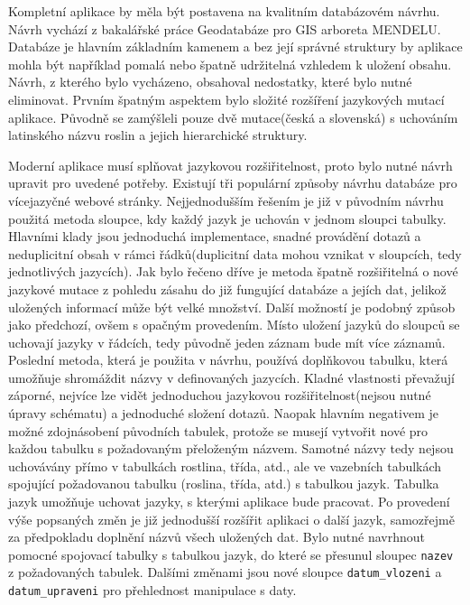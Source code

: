\documentclass[12pt]{article}%
\begin{document}
{{\obrazek
{}

Kompletní aplikace by měla být postavena na kvalitním databázovém návrhu. Návrh vychází 
z bakalářské práce Geodatabáze pro GIS arboreta MENDELU. Databáze je hlavním základním 
kamenem a bez její správné struktury by aplikace mohla být například pomalá nebo špatně udržitelná 
vzhledem k uložení obsahu. Návrh, z kterého bylo vycházeno, obsahoval nedostatky, které bylo 
nutné eliminovat. Prvním špatným aspektem bylo složité rozšíření jazykových mutací aplikace. 
Původně se zamýšleli pouze dvě mutace(česká a slovenská) s uchováním latinského názvu roslin 
a jejich hierarchické struktury. 

Moderní aplikace musí splňovat jazykovou rozšiřitelnost, proto 
bylo nutné návrh upravit pro uvedené potřeby. Existují tři populární způsoby návrhu databáze 
pro vícejazyčné webové stránky. Nejjednodušším řešením je již v původním návrhu použitá metoda sloupce, 
kdy každý jazyk je uchován v jednom sloupci tabulky. Hlavními klady jsou jednoduchá implementace, 
snadné provádění dotazů a neduplicitní obsah v rámci řádků(duplicitní data mohou vznikat 
v sloupcích, tedy jednotlivých jazycích). Jak bylo řečeno dříve je metoda špatně rozšiřitelná 
o nové jazykové mutace z pohledu zásahu do již fungující databáze a jejích dat, jelikož uložených
informací může být velké množství. Další možností je podobný způsob jako předchozí, ovšem s opačným 
provedením. Místo uložení jazyků do sloupců se uchovají jazyky v řádcích, tedy původně jeden záznam 
bude mít více záznamů. Poslední metoda, která je použita v návrhu, používá doplňkovou tabulku, která 
umožňuje shromáždit názvy v definovaných jazycích. Kladné vlastnosti převažují záporné, nejvíce lze
vidět jednoduchou jazykovou rozšiřitelnost(nejsou nutné úpravy schématu) a jednoduché složení dotazů.
Naopak hlavním negativem je možné zdojnásobení původních tabulek, protože se musejí vytvořit nové 
pro každou tabulku s požadovaným přeloženým názvem. Samotné názvy tedy nejsou uchovávány přímo 
v tabulkách rostlina, třída, atd., ale ve vazebních tabulkách spojující požadovanou tabulku
(roslina, třída, atd.) s tabulkou jazyk. Tabulka jazyk umožňuje uchovat jazyky, s kterými aplikace 
bude pracovat. Po provedení výše popsaných změn je již jednodušší rozšířit aplikaci o další jazyk, 
samozřejmě za předpokladu doplnění názvů všech uložených dat. Bylo nutné navrhnout pomocné spojovací 
tabulky s tabulkou jazyk, do které se přesunul sloupec \texttt{nazev} z požadovaných tabulek. 
Dalšími změnami jsou nové sloupce \texttt{datum\_vlozeni} a \texttt{datum\_upraveni} pro přehlednost 
manipulace s daty.

}}
\end{document}
